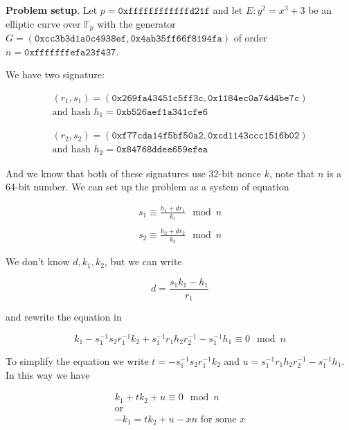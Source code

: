 \documentclass[a4paper,12pt]{report}
\newcommand{\F}{\mathbb{F}}
\begin{document}
\textbf{Problem setup}.
Let $p = \texttt{0xffffffffffffd21f}$ and let $E: y^2 = x^3 + 3$ be an elliptic curve over $\F_p$ with the generator
$G = (\texttt{0xcc3b3d1a0c4938ef}, \texttt{0x4ab35ff66f8194fa})$ of order $n = \texttt{0xfffffffefa23f437}$.

\vspace*{10px}

We have two signature:

\[
    \begin{array}{c}
        (r_1, s_1) = (\texttt{0x269fa43451c5ff3c}, \texttt{0x1184ec0a74d4be7c}) \\
        \text{and hash } h_1 = \texttt{0xb526aef1a341cfe6}
    \end{array}
\]

\[
    \begin{array}{c}
        (r_2, s_2) = (\texttt{0xf77cda14f5bf50a2}, \texttt{0xcd1143ccc1516b02}) \\ 
        \text{and hash } h_2 = \texttt{0x84768ddee659efea}
    \end{array}
\]

And we know that both of these signatures use 32-bit nonce $k$, note that $n$ is a 64-bit number. We can set up the problem as a system of equation

\[
    \begin{array}{c}
        s_1 \equiv \displaystyle\frac{h_1 + dr_1}{k_1} \mod n \\ \\ 
        s_2 \equiv \displaystyle\frac{h_2 + dr_2}{k_2} \mod n
    \end{array}
\]

We don't know $d, k_1, k_2$, but we can write 

\[
    d = \displaystyle\frac{s_1k_1 - h_1}{r_1}
\]

and rewrite the equation in

\[
    k_1 - s_1^{-1}s_2r_1^{-1}k_2 + s_1^{-1}r_1h_2r_2^{-1} - s_1^{-1}h_1 \equiv 0 \mod n
\]

To simplify the equation we write $t = - s_1^{-1}s_2r_1^{-1}k_2$ and $u = s_1^{-1}r_1h_2r_2^{-1} - s_1^{-1}h_1$. In this way we have

\[
    \begin{array}{c}
        k_1 + tk_2 + u \equiv 0 \mod n \\
        \text{or} \\
        -k_1 = tk_2 + u - xn \text{   for some $x$}
    \end{array}
\]
\end{document}
